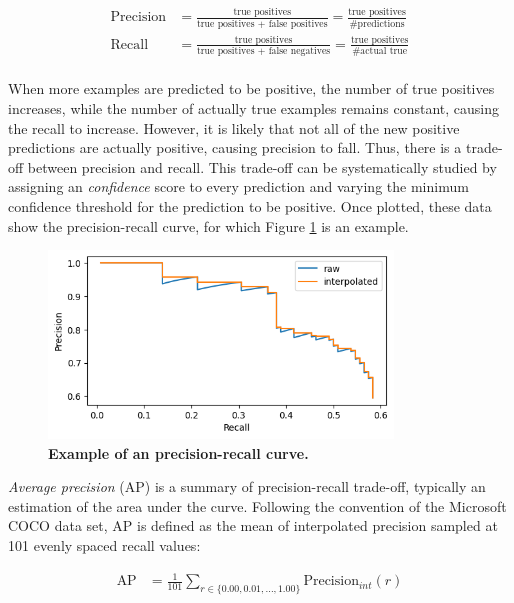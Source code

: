 \documentclass[12pt,a4paper,twoside,openany]{report}
\begin{document}
\begin{align*}
    \text{Precision} &= \frac{\text{true positives}}{\text{true positives + false positives}} = \frac{\text{true positives}}{\text{\# predictions}}\\
    \text{Recall} &= \frac{\text{true positives}}{\text{true positives + false negatives}} = \frac{\text{true positives}}{\text{\# actual true}}\\
\end{align*}

When more examples are predicted to be positive, the number of true positives increases, while the number of actually true examples remains constant, causing the recall to increase. However, it is likely that not all of the new positive predictions are actually positive, causing precision to fall. Thus, there is a trade-off between precision and recall. This trade-off can be systematically studied by assigning an \textit{confidence} score to every prediction and varying the minimum confidence threshold for the prediction to be positive. Once plotted, these data show the precision-recall curve, for which Figure \ref{fig:precision_recall} is an example.

\begin{figure}[h]
    \centering
    \includegraphics[height=5cm]{figs/eval/simple_mAP.png}
    \caption{\textbf{Example of an precision-recall curve.}}
    \label{fig:precision_recall}
\end{figure}

\textit{Average precision} (AP) is a summary of precision-recall trade-off, typically an estimation of the area under the curve. Following the convention of the Microsoft COCO \cite{lin_microsoft_2015} data set, AP is defined as the mean of interpolated precision sampled at 101 evenly spaced recall values:

\begin{align}
    \text{AP} &= \frac{1}{101} \sum\limits_{r\in \{0.00, 0.01, \dots, 1.00\}} \text{Precision}_{int}(r)
\end{align}
\end{document}

